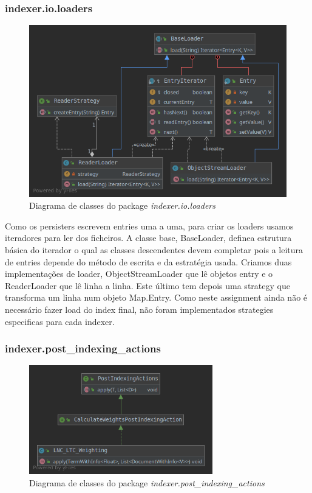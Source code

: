 \documentclass[12pt]{article}
\begin{document}
\subsubsection{indexer.io.loaders}
\begin{figure}[H]
  \center
  \includegraphics[width=12cm]{packages_indexer_io_loaders.png}
  \caption{Diagrama de classes do package \it indexer.io.loaders}
\end{figure}

Como os persisters escrevem entries uma a uma, para criar os loaders
usamos iteradores para ler dos ficheiros. A classe base, BaseLoader,
definea estrutura básica do iterador o qual as classes descendentes
devem completar pois a leitura de entries depende do método de
escrita e da estratégia usada. Criamos duas implementações de
loader, ObjectStreamLoader que lê objetos entry e o ReaderLoader que
lê linha a linha. Este último tem depois uma strategy que transforma
um linha num objeto Map.Entry. Como neste assignment ainda não é
necessário fazer load do index final, não foram implementados
strategies especificas para cada indexer.

\subsubsection{indexer.post\_indexing\_actions}

\begin{figure}[H]
  \center
  \includegraphics[width=8cm]{packages_indexer_postindexingactions.png}
  \caption{Diagrama de classes do package \it indexer.post\_indexing\_actions}
\end{figure}
\end{document}

